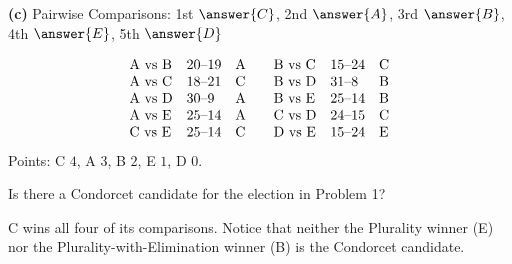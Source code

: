 \documentclass[12pt]{ximera}
\begin{document}
\begin{problem}
\begin{prompt}
\textbf{(c)} Pairwise Comparisons: 1st $\answer{C}$, 2nd $\answer{A}$, 3rd $\answer{B}$,
4th $\answer{E}$, 5th $\answer{D}$

\begin{feedback}
\[
\begin{array}{lll@{\qquad}lll}
\text{A vs B} & 20\text{--}19 & \text{A} & \text{B vs C} & 15\text{--}24 & \text{C}\\
\text{A vs C} & 18\text{--}21 & \text{C} & \text{B vs D} & 31\text{--}8 & \text{B}\\
\text{A vs D} & 30\text{--}9 & \text{A} & \text{B vs E} & 25\text{--}14 & \text{B}\\
\text{A vs E} & 25\text{--}14 & \text{A} & \text{C vs D} & 24\text{--}15 & \text{C}\\
\text{C vs E} & 25\text{--}14 & \text{C} & \text{D vs E} & 15\text{--}24 & \text{E}
\end{array}
\]
Points: C $4$, A $3$, B $2$, E $1$, D $0$.
\end{feedback}
\end{prompt}
\end{problem}

\begin{problem}
Is there a Condorcet candidate for the election in Problem 1?

\begin{multipleChoice}
\end{multipleChoice}

\begin{feedback}
C wins all four of its comparisons. Notice that neither the Plurality winner (E) nor the
Plurality-with-Elimination winner (B) is the Condorcet candidate.
\end{feedback}
\end{problem}
\end{document}

